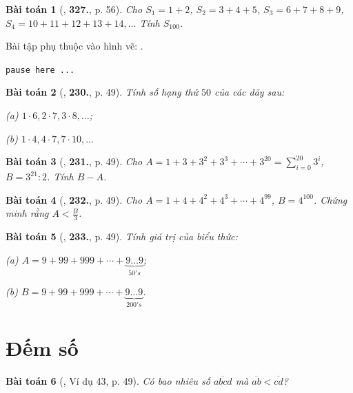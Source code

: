 \documentclass{article}
\numberwithin{equation}{section}
\newtheorem{baitoan}{Bài toán}
\begin{document}
\begin{baitoan}[\cite{Binh_Toan_6_tap_1}, \textbf{327.}, p. 56]
	Cho $S_1 = 1 + 2$, $S_2 = 3 + 4 + 5$, $S_3 = 6 + 7 + 8 + 9$, $S_4 = 10 + 11 + 12 + 13 + 14,\ldots$ Tính $S_{100}$.
\end{baitoan}
Bài tập phụ thuộc vào hình vẽ: \cite[\textbf{328.}--\textbf{331.}, p. 57]{Binh_Toan_6_tap_1}.

\texttt{pause here ...}

\begin{baitoan}[\cite{Binh_Toan_6_tap_1}, \textbf{230.}, p. 49]
	Tính số hạng thứ $50$ của các dãy sau:
	\begin{enumerate*}
		\item[(a)] $1\cdot 6,2\cdot 7,3\cdot 8,\ldots$;
		\item[(b)] $1\cdot 4,4\cdot 7,7\cdot 10,\ldots$
	\end{enumerate*}
\end{baitoan}

\begin{baitoan}[\cite{Binh_Toan_6_tap_1}, \textbf{231.}, p. 49]
	Cho $A = 1 + 3 + 3^2 + 3^3 + \cdots + 3^{20} = \sum_{i=0}^{20} 3^i$, $B = 3^{21}:2$. Tính $B - A$.
\end{baitoan}

\begin{baitoan}[\cite{Binh_Toan_6_tap_1}, \textbf{232.}, p. 49]
	Cho $A = 1 + 4 + 4^2 + 4^3 + \cdots + 4^{99}$, $B = 4^{100}$. Chứng minh rằng $A < \frac{B}{3}$.
\end{baitoan}

\begin{baitoan}[\cite{Binh_Toan_6_tap_1}, \textbf{233.}, p. 49]
	Tính giá trị của biểu thức:
	
	\begin{enumerate*}
		\item[(a)] $A = 9 + 99 + 999 + \cdots + \underbrace{9\ldots 9}_{50's}$;
		\item[(b)] $B = 9 + 99 + 999 + \cdots + \underbrace{9\ldots 9}_{200's}$.
	\end{enumerate*}
\end{baitoan}

\section{Đếm số}

\begin{baitoan}[\cite{Binh_Toan_6_tap_1}, Ví dụ 43, p. 49]
	Có bao nhiêu số $\overline{abcd}$ mà $\overline{ab} < \overline{cd}$?
\end{baitoan}
\end{document}
